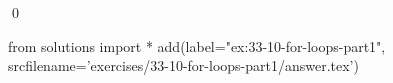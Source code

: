 
\begin{ex}
  \label{ex:33-10-for-loops-part1}
  
  \qed
\end{ex}
\begin{python0}
from solutions import *
add(label="ex:33-10-for-loops-part1",
    srcfilename='exercises/33-10-for-loops-part1/answer.tex')
\end{python0}
